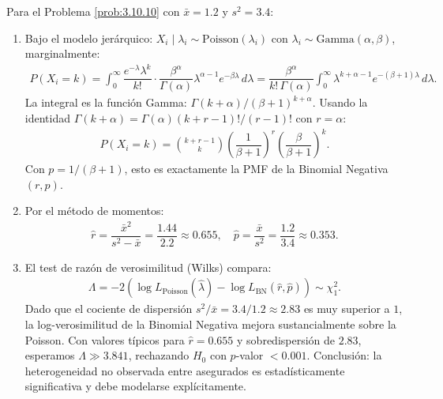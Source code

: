 \begin{solucion}
	\label{sol:3.10.10}
	Para el Problema \ref{prob:3.10.10} con $\bar{x} = 1.2$ y $s^{2} = 3.4$:
	\begin{enumerate}
		\item Bajo el modelo jerárquico: $X_{i} \mid \lambda_{i} \sim \text{Poisson}(\lambda_{i})$ con $\lambda_{i} \sim \text{Gamma}(\alpha, \beta)$, marginalmente:
		\begin{align*}
			P(X_{i} = k) = \int_{0}^{\infty} \dfrac{e^{-\lambda}\lambda^{k}}{k!} \cdot \dfrac{\beta^{\alpha}}{\Gamma(\alpha)}\lambda^{\alpha-1}e^{-\beta\lambda}\,d\lambda = \dfrac{\beta^{\alpha}}{k!\,\Gamma(\alpha)} \int_{0}^{\infty} \lambda^{k+\alpha-1} e^{-(\beta+1)\lambda}\,d\lambda.
		\end{align*}
		La integral es la función Gamma: $\Gamma(k + \alpha)/(\beta + 1)^{k+\alpha}$. Usando la identidad $\Gamma(k + \alpha) = \Gamma(\alpha)(k+r-1)!/(r-1)!$ con $r = \alpha$:
		\begin{align*}
			P(X_{i} = k) = \binom{k + r - 1}{k}\left(\dfrac{1}{\beta+1}\right)^{r}\left(\dfrac{\beta}{\beta+1}\right)^{k}.
		\end{align*}
		Con $p = 1/(\beta+1)$, esto es exactamente la PMF de la Binomial Negativa $(r, p)$.
		\item Por el método de momentos:
		\begin{align*}
			\hat{r} = \dfrac{\bar{x}^{2}}{s^{2} - \bar{x}} = \dfrac{1.44}{2.2} \approx 0.655, \quad \hat{p} = \dfrac{\bar{x}}{s^{2}} = \dfrac{1.2}{3.4} \approx 0.353.
		\end{align*}
		\item El test de razón de verosimilitud (Wilks) compara:
		\begin{align*}
			\Lambda = -2(\log L_{\text{Poisson}}(\hat{\lambda}) - \log L_{\text{BN}}(\hat{r}, \hat{p})) \sim \chi^{2}_{1}.
		\end{align*}
		Dado que el cociente de dispersión $s^{2}/\bar{x} = 3.4/1.2 \approx 2.83$ es muy superior a $1$, la log-verosimilitud de la Binomial Negativa mejora sustancialmente sobre la Poisson. Con valores típicos para $\hat{r} = 0.655$ y sobredispersión de $2.83$, esperamos $\Lambda \gg 3.841$, rechazando $H_{0}$ con $p$-valor $< 0.001$. Conclusión: la heterogeneidad no observada entre asegurados es estadísticamente significativa y debe modelarse explícitamente. \qedhere
	\end{enumerate}
\end{solucion}
